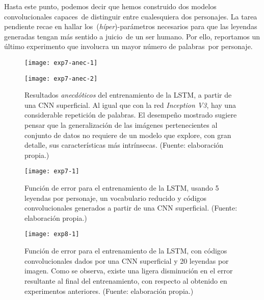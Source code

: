 Hasta este punto, podemos decir que hemos construido dos modelos convolucionales capaces\
de distinguir entre cualesquiera dos personajes. La tarea pendiente recae en hallar los\
(\emph{híper})-parámetros necesarios para que las leyendas generadas tengan más sentido a juicio\
de un ser humano. Por ello, reportamos un último experimento que involucra un mayor número de palabras\
por personaje.

\begin{figure}[H]
  \begin{minipage}[c]{\linewidth}
    \texttt{[image: exp7-anec-1]}
  \end{minipage}\hfill
  \begin{minipage}[c]{\linewidth}
    \texttt{[image: exp7-anec-2]}
  \end{minipage}
  \caption{
    Resultados \emph{anecdóticos} del entrenamiento de la LSTM, a partir de una CNN superficial.
    Al igual que con la red \emph{Inception V3}, hay una considerable repetición de palabras.
    El desempeño mostrado sugiere pensar que la generalización de las imágenes pertenecientes
    al conjunto de datos no requiere de un modelo que explore, con gran detalle, sus características
    más intrínsecas.
    (Fuente: elaboración propia.)
  }
  \label{exp7:anec}
\end{figure}

\begin{figure}[H]
  \texttt{[image: exp7-1]}
  \caption{
    Función de error para el entrenamiento de la LSTM, usando 5 leyendas por personaje,
    un vocabulario reducido y códigos convolucionales generados a partir de una CNN superficial.
    (Fuente: elaboración propia.)
  }
  \label{exp7}
\end{figure}

\begin{figure}[H]
  \texttt{[image: exp8-1]}
  \caption{
    Función de error para el entrenamiento de la LSTM, con códigos convolucionales dados
    por una CNN superficial y 20 leyendas por imagen. Como se observa, existe una ligera
    disminución en el error resultante al final del entrenamiento, con respecto al obtenido
    en experimentos anteriores.
    (Fuente: elaboración propia.)
  }
  \label{exp8}
\end{figure}

